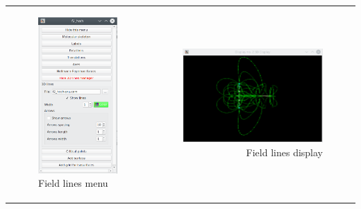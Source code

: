 \documentclass[10pt]{article}
\begin{document}
\hspace*{-5mm}
\begin{tabular}{lr}
\begin{minipage}{.3\linewidth}
    \begin{figure}[H]
        \begin{center}
            \includegraphics[width=0.4\linewidth]{damqt320_field_lines.png}
        \end{center}
        \vspace*{1mm}
        \caption{Field lines menu \label{fig:4_13_7_1}}
    \end{figure}
\end{minipage}
&
\begin{minipage}{.7\linewidth}
    \begin{figure}[H]
        \begin{center}
            
            \includegraphics[width=0.55\linewidth]{damqt320_field_display.png}
        \end{center}
        \vspace*{-1mm}
        \caption{Field lines display \label{fig:4_13_7_2}}
    \end{figure}
\end{minipage}
\end{tabular}
\vspace*{5mm}
\end{document}
